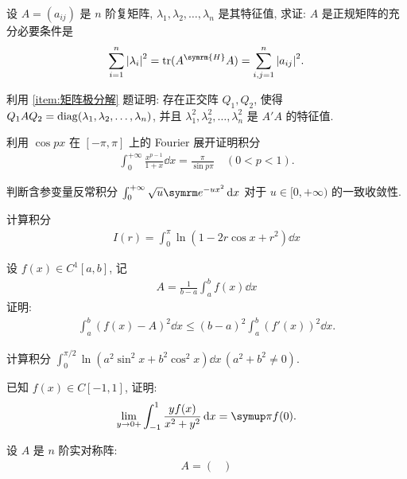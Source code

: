     \begin{exercise}[resume=exer]
        \sitem 设 $ A = (a_{ij}) $ 是 $ n $ 阶复矩阵, $ \lambda_{1}, \lambda_{2}, \dots, \lambda_{n} $ 是其特征值, 求证: $ A $ 是正规矩阵的充分必要条件是
        \begin{align*}
            \sum_{i=1}^{n}\abs{\lambda_{i}}^{2} = \tr(A^{\symrm{H}}A) = \sum_{i, j=1}^{n}\abs{a_{ij}}^{2}.
        \end{align*}
        \item 利用 \ref{item:矩阵极分解} 题证明: 存在正交阵 $ Q_{1}, Q_{2} $, 使得 $ Q_{1} A Q_{2} = \operatorname{diag}(\lambda_{1}, \lambda_{2}, \dots, \lambda_{n}) $, 并且 $ \lambda_{1}^{2}, \lambda_{2}^{2}, \dots, \lambda_{n}^{2} $ 是 $ A'A $ 的特征值. 
        \item 利用 $ \cos px $ 在 $ [-\pi, \pi] $ 上的 Fourier 展开证明积分 
        \begin{align*}
            \int_{0}^{+\infty} \frac{x^{p-1}}{1+x} \dd{x} = \frac{\pi}{\sin p\pi}\quad (0<p<1).
        \end{align*}
        \item 判断含参变量反常积分 $ \int_{0}^{+\infty}\sqrt{u}\me^{-ux^{2}} \dd{x} $ 对于 $ u \in [0, +\infty) $ 的一致收敛性. 
        \item 计算积分
        \begin{align*}
            I(r) = \int_{0}^{\pi} \ln(1 - 2r\cos x + r^{2}) \dd{x}
        \end{align*}
        \item 设 $ f(x)\in C^{1}[a, b] $, 记
        \begin{align*}
            A = \frac{1}{b - a}\int_{a}^{b} f(x) \dd{x}
        \end{align*}
        证明:
        \begin{align*}
            \int_{a}^{b}(f(x) - A)^{2} \dd{x} \le (b-a)^{2} \int_{a}^{b} (f'(x))^{2} \dd{x}.
        \end{align*}
        \item 计算积分 $ \int_{0}^{\pi/2} \ln(a^{2}\sin^{2}x + b^{2}\cos^{2} x)\dd{x}\,(a^{2} + b^{2} \ne 0) $.
        \item 已知 $ f(x) \in C[-1, 1] $, 证明:
        \begin{align*}
            \limit{y}{0+} \int_{-1}^{1}\frac{yf(x)}{x^{2} + y^{2}} \dd{x} = \pi f(0).
        \end{align*}
        \item 设 $ A $ 是 $ n $ 阶实对称阵:
        \begin{align*}
            A = \begin{pmatrix}

\end{pmatrix}
\end{align*}
\end{exercise}
